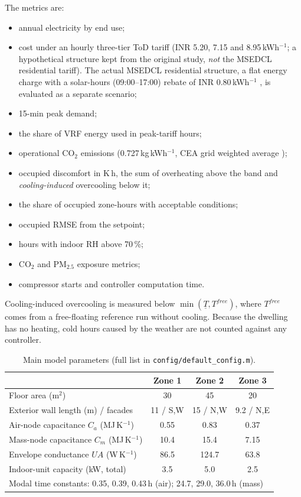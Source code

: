 The metrics are:
\begin{itemize}
  \item annual electricity by end use;
  \item cost under an hourly three-tier ToD tariff (INR 5.20, 7.15 and 8.95\,kWh$^{-1}$;
        a hypothetical structure kept from the original study, \emph{not} the MSEDCL
        residential tariff). The actual MSEDCL residential structure, a flat energy
        charge with a solar-hours (09:00--17:00) rebate of INR 0.80\,kWh$^{-1}$
        \cite{merc}, is evaluated as a separate scenario;
  \item 15-min peak demand;
  \item the share of VRF energy used in peak-tariff hours;
  \item operational CO$_2$ emissions (0.727\,kg\,kWh$^{-1}$, CEA grid weighted average \cite{cea});
  \item occupied discomfort in K\,h, the sum of overheating above the band and
        \emph{cooling-induced} overcooling below it;
  \item the share of occupied zone-hours with acceptable conditions;
  \item occupied RMSE from the setpoint;
  \item hours with indoor RH above 70\,\%;
  \item CO$_2$ and PM$_{2.5}$ exposure metrics;
  \item compressor starts and controller computation time.
\end{itemize}
Cooling-induced overcooling is measured below $\min(\underline T, T^{free})$, where
$T^{free}$ comes from a free-floating reference run without cooling. Because the
dwelling has no heating, cold hours caused by the weather are not counted against any
controller.

\begin{table}[t]\centering\small
\caption{Main model parameters (full list in \texttt{config/default\_config.m}).}\label{tab:params}
\begin{tabular}{lccc}\toprule
 & Zone 1 & Zone 2 & Zone 3\\\midrule
Floor area (m$^2$) & 30 & 45 & 20\\
Exterior wall length (m) / facades & 11 / S,W & 15 / N,W & 9.2 / N,E\\
Air-node capacitance $C_a$ (MJ\,K$^{-1}$) & 0.55 & 0.83 & 0.37\\
Mass-node capacitance $C_m$ (MJ\,K$^{-1}$) & 10.4 & 15.4 & 7.15\\
Envelope conductance $UA$ (W\,K$^{-1}$) & 86.5 & 124.7 & 63.8\\
Indoor-unit capacity (kW, total) & 3.5 & 5.0 & 2.5\\\midrule
\multicolumn{4}{l}{Modal time constants: 0.35, 0.39, 0.43\,h (air); 24.7, 29.0, 36.0\,h (mass)}\\
\bottomrule\end{tabular}
\end{table}
